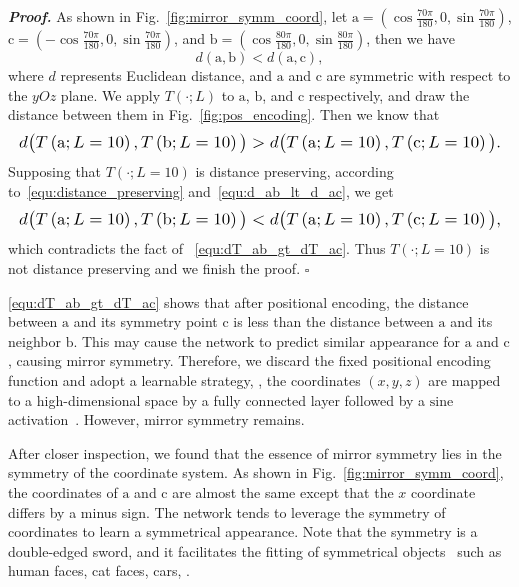 \documentclass[10pt,twocolumn,letterpaper]{article}
\begin{document}
\textit{\textbf{Proof.}}\quad
As shown in Fig.~\ref{fig:mirror_symm_coord}, let $\mathrm{a}=(\cos\frac{70\pi}{180}, 0, \sin\frac{70\pi}{180})$, $\mathrm{c}=(-\cos\frac{70\pi}{180}, 0, \sin\frac{70\pi}{180})$, and $\mathrm{b}=(\cos\frac{80\pi}{180}, 0, \sin\frac{80\pi}{180})$, then we have
\begin{equation}
  d(\mathrm{a}, \mathrm{b}) < d(\mathrm{a}, \mathrm{c}),
  \label{equ:d_ab_lt_d_ac}
\end{equation}
where $d$ represents Euclidean distance, and $\mathrm{a}$ and $\mathrm{c}$ are symmetric with respect to the $yOz$ plane. We apply $T(\cdot; L)$ to $\mathrm{a}$, $\mathrm{b}$, and $\mathrm{c}$ respectively, and draw the distance between them in Fig.~\ref{fig:pos_encoding}. Then we know that
\begin{equation}
  \resizebox{\hsize}{!}{$
      d\big( T\left(\mathrm{a}; L=10\right), T\left(\mathrm{b}; L=10\right) \big) > d\big( T\left(\mathrm{a}; L=10\right), T\left(\mathrm{c}; L=10\right) \big).
    $}
  \label{equ:dT_ab_gt_dT_ac}
\end{equation}
Supposing that $T(\cdot; L=10)$ is distance preserving, according to~\cref{equ:distance_preserving} and~\cref{equ:d_ab_lt_d_ac}, we get
\begin{equation}
  \resizebox{\hsize}{!}{$
      d\big( T\left(\mathrm{a}; L=10\right), T\left(\mathrm{b}; L=10\right) \big) < d\big( T\left(\mathrm{a}; L=10\right), T\left(\mathrm{c}; L=10\right) \big),
    $}
\end{equation}
which contradicts the fact of ~\cref{equ:dT_ab_gt_dT_ac}. Thus $T(\cdot; L=10)$ is not distance preserving and we finish the proof.
\hfill$\square$

\cref{equ:dT_ab_gt_dT_ac} shows that after positional encoding, the distance between $\mathrm{a}$ and its symmetry point $\mathrm{c}$ is less than the distance between $\mathrm{a}$ and its neighbor $\mathrm{b}$. This may cause the network to predict similar appearance for $\mathrm{a}$ and $\mathrm{c}$, causing mirror symmetry. Therefore, we discard the fixed positional encoding function and adopt a learnable strategy, \ie, the coordinates $(x, y, z)$ are mapped to a high-dimensional space by a fully connected layer followed by a $\mathrm{sine}$ activation~\cite{sitzmann2020Implicit}. However, mirror symmetry remains.

After closer inspection, we found that the essence of mirror symmetry lies in the symmetry of the coordinate system. As shown in Fig.~\ref{fig:mirror_symm_coord}, the coordinates of $\mathrm{a}$ and $\mathrm{c}$ are almost the same except that the $x$ coordinate differs by a minus sign. The network tends to leverage the symmetry of coordinates to learn a symmetrical appearance. Note that the symmetry is a double-edged sword, and it facilitates the fitting of symmetrical objects~\cite{wu2020Unsupervised,pan20212D} such as human faces, cat faces, cars, \etc.
\end{document}
